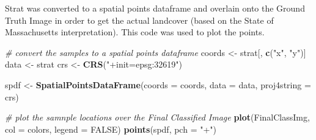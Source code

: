 \documentclass[]{article}
\newenvironment{Shaded}{\begin{snugshade}}{\end{snugshade}}
\newcommand{\KeywordTok}[1]{\textcolor[rgb]{0.13,0.29,0.53}{\textbf{#1}}}
\newcommand{\DataTypeTok}[1]{\textcolor[rgb]{0.13,0.29,0.53}{#1}}
\newcommand{\DecValTok}[1]{\textcolor[rgb]{0.00,0.00,0.81}{#1}}
\newcommand{\StringTok}[1]{\textcolor[rgb]{0.31,0.60,0.02}{#1}}
\newcommand{\CommentTok}[1]{\textcolor[rgb]{0.56,0.35,0.01}{\textit{#1}}}
\newcommand{\OtherTok}[1]{\textcolor[rgb]{0.56,0.35,0.01}{#1}}
\newcommand{\ControlFlowTok}[1]{\textcolor[rgb]{0.13,0.29,0.53}{\textbf{#1}}}
\newcommand{\OperatorTok}[1]{\textcolor[rgb]{0.81,0.36,0.00}{\textbf{#1}}}
\newcommand{\NormalTok}[1]{#1}
\begin{document}
\begin{Shaded}
\end{Shaded}

Strat was converted to a spatial points dataframe and overlain onto the
Ground Truth Image in order to get the actual landcover (based on the
State of Massachusetts interpretation). This code was used to plot the
points.

\begin{Shaded}
\begin{Highlighting}[]
\CommentTok{# convert the samples to a spatial points dataframe }
\NormalTok{coords <-}\StringTok{ }\NormalTok{strat[, }\KeywordTok{c}\NormalTok{(}\StringTok{"x"}\NormalTok{, }\StringTok{"y"}\NormalTok{)]}
\NormalTok{data <-}\StringTok{ }\NormalTok{strat}
\NormalTok{crs <-}\StringTok{ }\KeywordTok{CRS}\NormalTok{(}\StringTok{"+init=epsg:32619"}\NormalTok{)}

\NormalTok{spdf <-}\StringTok{ }\KeywordTok{SpatialPointsDataFrame}\NormalTok{(}\DataTypeTok{coords =}\NormalTok{ coords,}
                               \DataTypeTok{data =}\NormalTok{ data,}
                               \DataTypeTok{proj4string =}\NormalTok{ crs)}

\CommentTok{# plot the samnple locations over the Final Classified Image}
\KeywordTok{plot}\NormalTok{(FinalClassImg, }\DataTypeTok{col =}\NormalTok{ colors, }\DataTypeTok{legend =} \OtherTok{FALSE}\NormalTok{)}
\KeywordTok{points}\NormalTok{(spdf, }\DataTypeTok{pch =} \StringTok{"+"}\NormalTok{)}
\end{Highlighting}
\end{Shaded}
\end{document}
